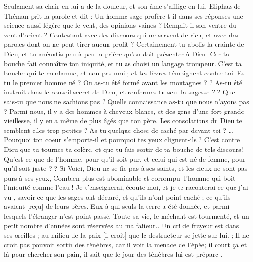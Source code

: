 \begin{multicols}{2}
Seulement sa chair en lui a de la douleur, et son âme s'afflige en lui. 
\VerseOne{}Eliphaz de Théman prit la parole et dit :
Un homme sage profère-t-il dans ses réponses une science aussi légère que le vent, des opinions vaines ? Remplit-il son ventre du vent d'orient ?
Contestant avec des discours qui ne servent de rien, et avec des paroles dont on ne peut tirer aucun profit ?
Certainement tu abolis la crainte de Dieu, et tu anéantis peu à peu la prière qu'on doit présenter à Dieu. 
 Car ta bouche fait connaître ton iniquité, et tu as choisi un langage trompeur. 
C'est ta bouche qui te condamne, et non pas moi ; et tes lèvres témoignent contre toi. 
Es-tu le premier homme né ? Ou as-tu été formé avant les montagnes ?  ?
As-tu été instruit dans le conseil secret de Dieu, et renfermes-tu seul la sagesse ?  ?
Que sais-tu que nous ne sachions pas ? Quelle connaissance as-tu que nous n'ayons pas ?
Parmi nous, il y a des hommes à cheveux blancs, et des gens d'une fort grande vieillesse, il y en a même de plus âgés que ton père. 
Les consolations du Dieu te semblent-elles trop petites ? As-tu quelque chose de caché par-devant toi ? …
Pourquoi ton coeur s'emporte-il et pourquoi tes yeux clignent-ils ?
C'est contre Dieu que tu tournes ta colère, et que tu fais sortir de ta bouche de tels discours! 
Qu'est-ce que de l'homme, pour qu'il soit pur, et celui qui est né de femme, pour qu'il soit juste ?  ?
Si Voici, Dieu ne se fie pas à ses saints, et les cieux ne sont pas purs à ses yeux,
Combien plus est abominable et corrompu, l'homme qui boit l'iniquité comme l'eau !  
Je t'enseignerai, écoute-moi, et je te raconterai ce que j'ai vu ,
 savoir ce que les sages ont déclaré, et qu'ils n'ont point caché ; ce qu'ils avaient [reçu] de leurs pères.
Eux à qui seuls la terre a été donnée, et parmi lesquels l'étranger n'est point passé.
Toute sa vie, le méchant est tourmenté, et un petit nombre d'années sont réservées au malfaiteur..
Un cri de frayeur est dans ses oreilles ; au milieu de la paix [il croit] que le destructeur se jette sur lui.  ;
Il ne croit pas pouvoir sortir des ténèbres, car il voit la menace de   l’épée;
il court çà et là pour chercher son pain, il sait que le jour des ténèbres lui est préparé .

\end{multicols}
